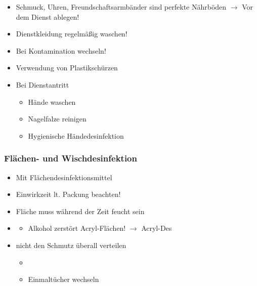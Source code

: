 \begin{itemize}
    \item Schmuck, Uhren, Freundschaftsarmb\"ander sind perfekte
    N\"ahrb\"oden ${\rightarrow}$ Vor dem Dienst ablegen!
    \item Dienstkleidung regelm\"a{\ss}ig waschen!
    \item Bei Kontamination wechseln!
    \item Verwendung von Plastiksch\"urzen
    \item Bei Dienstantritt
    \begin{itemize}
        \item H\"ande waschen
        \item Nagelfalze reinigen
        \item Hygienische H\"andedesinfektion
    \end{itemize}
\end{itemize}



\subsubsection{Flächen- und Wischdesinfektion}

\begin{itemize}
    \item Mit Fl\"achendesinfektionsmittel 
    \item Einwirkzeit lt. Packung beachten!
    \item Fl\"ache muss w\"ahrend der Zeit feucht sein
    \item {}
    \begin{itemize}
        \item Alkohol zerst\"ort Acryl-Fl\"achen! ${\rightarrow}$
        Acryl-Des{\texttrademark}
    \end{itemize}
    \item nicht den Schmutz \"uberall verteilen
    \begin{itemize}
        \item {}
        \item Einmalt\"ucher wechseln
    \end{itemize}
\end{itemize}

